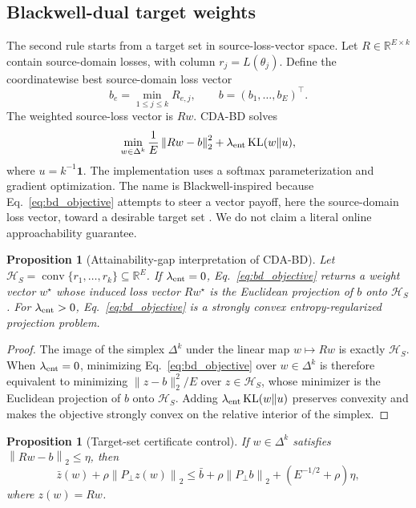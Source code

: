 \documentclass{article}
\newtheorem{proposition}[theorem]{Proposition}
\theoremstyle{definition}
\newcommand{\RR}{\mathbb{R}}
\newcommand{\cH}{\mathcal{H}}
\newcommand{\KL}{\operatorname{KL}}
\newcommand{\simplex}{\Delta}
\newcommand{\one}{\mathbf{1}}
\newcommand{\bd}{\textup{\textsc{CDA-BD}}}
\newcommand{\norm}[1]{\left\lVert #1 \right\rVert}
\newcommand{\paren}[1]{\left( #1 \right)}
\begin{document}
\subsection{Blackwell-dual target weights}

The second rule starts from a target set in source-loss-vector space. Let \(R\in\RR^{E\times k}\) contain source-domain losses, with column \(r_j=L(\theta_j)\). Define the coordinatewise best source-domain loss vector
\begin{equation}
b_e=\min_{1\le j\le k}R_{e,j},
\qquad
b=(b_1,\dots,b_E)^\top.
\label{eq:blackwell_target}
\end{equation}
The weighted source-loss vector is \(Rw\). \bd{} solves
\begin{equation}
\min_{w\in\simplex^k}
\frac{1}{E}\norm{Rw-b}_2^2
+\lambda_{\rm ent}\KL(w\|u),
\label{eq:bd_objective}
\end{equation}
where \(u=k^{-1}\one\). The implementation uses a softmax parameterization and gradient optimization. The name is Blackwell-inspired because Eq.~\eqref{eq:bd_objective} attempts to steer a vector payoff, here the source-domain loss vector, toward a desirable target set \citep{blackwell1956analog}. We do not claim a literal online approachability guarantee.

\begin{proposition}[Attainability-gap interpretation of \bd{}]
\label{prop:bd_projection}
Let \(\cH_S=\operatorname{conv}\{r_1,\dots,r_k\}\subseteq\RR^E\). If \(\lambda_{\rm ent}=0\), Eq.~\eqref{eq:bd_objective} returns a weight vector \(w^\star\) whose induced loss vector \(Rw^\star\) is the Euclidean projection of \(b\) onto \(\cH_S\). For \(\lambda_{\rm ent}>0\), Eq.~\eqref{eq:bd_objective} is a strongly convex entropy-regularized projection problem.
\end{proposition}

\begin{proof}
The image of the simplex \(\simplex^k\) under the linear map \(w\mapsto Rw\) is exactly \(\cH_S\). When \(\lambda_{\rm ent}=0\), minimizing Eq.~\eqref{eq:bd_objective} over \(w\in\simplex^k\) is therefore equivalent to minimizing \(\|z-b\|_2^2/E\) over \(z\in\cH_S\), whose minimizer is the Euclidean projection of \(b\) onto \(\cH_S\). Adding \(\lambda_{\rm ent}\KL(w\|u)\) preserves convexity and makes the objective strongly convex on the relative interior of the simplex.
\end{proof}

\begin{proposition}[Target-set certificate control]
\label{prop:target_set}
If \(w\in\simplex^k\) satisfies \(\norm{Rw-b}_2\le \eta\), then
\begin{equation}
\bar z(w)+\rho\norm{P_\perp z(w)}_2
\le
\bar b+\rho\norm{P_\perp b}_2
+\paren{E^{-1/2}+\rho}\eta,
\label{eq:bd_bound}
\end{equation}
where \(z(w)=Rw\).
\end{proposition}
\end{document}
